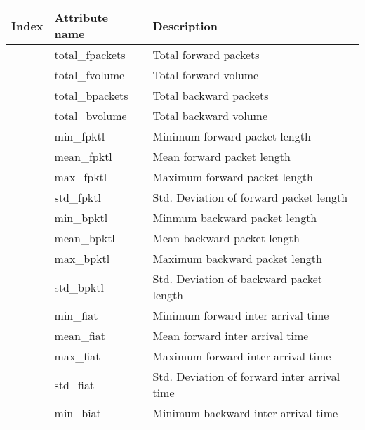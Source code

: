 \begin{table}[H]

  \newcommand{\netaicnt}[0]{\stepcounter{netAICounter}\arabic{netAICounter}}
  
  \begin{tabular}{lll}
    \toprule
    Index & Attribute name & Description \\
    \midrule
    \netaicnt & total\_fpackets & Total forward packets \\
    \netaicnt & total\_fvolume & Total forward volume \\
    \netaicnt & total\_bpackets & Total backward packets \\
    \netaicnt & total\_bvolume & Total backward volume \\
    \netaicnt & min\_fpktl & Minimum forward packet length \\
    \netaicnt & mean\_fpktl & Mean forward packet length \\
    \netaicnt & max\_fpktl & Maximum forward packet length \\
    \netaicnt & std\_fpktl & Std. Deviation of forward packet length \\
    \netaicnt & min\_bpktl & Minmum backward packet length \\
    \netaicnt & mean\_bpktl & Mean backward packet length \\
    \netaicnt & max\_bpktl & Maximum backward packet length \\
    \netaicnt & std\_bpktl & Std. Deviation of backward packet length \\
    \netaicnt & min\_fiat & Minimum forward inter arrival time \\
    \netaicnt & mean\_fiat & Mean forward inter arrival time \\
    \netaicnt & max\_fiat & Maximum forward inter arrival time \\
    \netaicnt & std\_fiat & Std. Deviation of forward inter arrival time \\
    \netaicnt & min\_biat & Minimum backward inter arrival time \\

\end{tabular}
\end{table}
